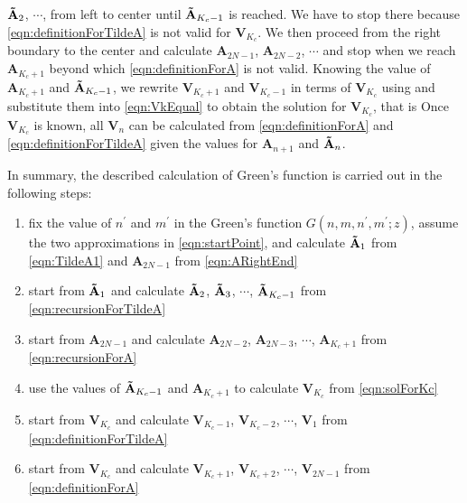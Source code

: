 $\mathbf{\Tilde{A}}_{2}$, $\cdots$, from left to
center until $\mathbf{\Tilde{A}}_{K_c - 1}$ is reached. We have to stop there because  
\autoref{eqn:definitionForTildeA} is not valid for  $\mathbf{V}_{K_c}$. 
We then proceed from the right boundary to the center and calculate $\mathbf{A}_{2N-1}$, 
$\mathbf{A}_{2N-2}$, $\cdots$ and stop when we reach $\mathbf{A}_{K_c + 1}$ beyond which
\autoref{eqn:definitionForA} is not valid. Knowing the value of $\mathbf{A}_{K_c + 1}$ and 
$\mathbf{\Tilde{A}}_{K_c - 1}$, we rewrite $\mathbf{V}_{K_c +1}$ and $\mathbf{V}_{K_c - 1}$ in terms of
 $\mathbf{V}_{K_c}$ using
and substitute them into \autoref{eqn:VkEqual} to obtain the solution for $\mathbf{V}_{K_c}$, that is
Once $\mathbf{V}_{K_c}$ is known, all $\mathbf{V}_{n}$ can be calculated from \autoref{eqn:definitionForA} and
\autoref{eqn:definitionForTildeA} given the values for $\mathbf{A}_{n+1}$ and $\mathbf{\Tilde{A}}_{n}$.

In summary, the described calculation of Green's function is carried out in the following steps: 
\begin{enumerate}
\item{fix the value of $n^{\prime}$ and $m^{\prime}$ in the Green's function $G(n, m, n^{\prime}, m^{\prime}; z)$, 
assume the two approximations in \autoref{eqn:startPoint}, and calculate $\mathbf{\Tilde{A}}_{1}$ from 
\autoref{eqn:TildeA1} and $\mathbf{A}_{2N-1}$ from \autoref{eqn:ARightEnd} }
\item{start from $\mathbf{\Tilde{A}}_{1}$ and calculate $\mathbf{\Tilde{A}}_{2}$, $\mathbf{\Tilde{A}}_{3}$, $\cdots$, 
$\mathbf{\Tilde{A}}_{K_c - 1}$ from \autoref{eqn:recursionForTildeA} }
\item{start from $\mathbf{A}_{2N-1}$ and calculate $\mathbf{A}_{2N-2}$, 
$\mathbf{A}_{2N-3}$, $\cdots$, $\mathbf{A}_{K_c + 1}$ from \autoref{eqn:recursionForA} }
\item{use the values of $\mathbf{\Tilde{A}}_{K_c - 1}$ and $\mathbf{A}_{K_c + 1}$ to calculate $\mathbf{V}_{K_c}$ 
from \autoref{eqn:solForKc} }
\item{start from $\mathbf{V}_{K_c}$ and calculate $\mathbf{V}_{K_c-1}$, $\mathbf{V}_{K_c-2}$, $\cdots$, 
$\mathbf{V}_{1}$ from \autoref{eqn:definitionForTildeA} }
\item{start from $\mathbf{V}_{K_c}$ and calculate $\mathbf{V}_{K_c+1}$, $\mathbf{V}_{K_c+2}$, $\cdots$, $\mathbf{V}_{2N-1}$ from \autoref{eqn:definitionForA} }
\end{enumerate}

